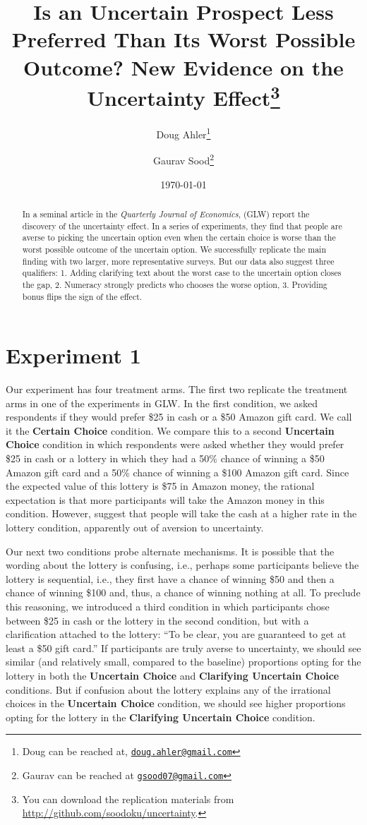 \documentclass[12pt, letterpaper]{article}
\title{Is an Uncertain Prospect Less Preferred Than Its Worst Possible Outcome? New Evidence on the Uncertainty Effect\thanks{You can download the replication materials from \href{http://github.com/soodoku/uncertainty}{http://github.com/soodoku/uncertainty}.}}
\author{Doug Ahler\thanks{Doug can be reached at, \href{mailto:doug.ahler@gmail.com}{\footnotesize{\texttt{doug.ahler@gmail.com}}}} \and Gaurav Sood\thanks{Gaurav can be reached at \href{mailto:gsood07@gmail.com}{\footnotesize{\texttt{gsood07@gmail.com}}}}}
\date{\today}
\begin{document}
\maketitle

\thispagestyle{empty}
\begin{abstract}
\noindent In a seminal article in the \textit{Quarterly Journal of Economics}, \cite{gneezy2006uncertainty} (GLW) report the discovery of the uncertainty effect. In a series of experiments, they find that people are averse to picking the uncertain option even when the certain choice is worse than the worst possible outcome of the uncertain option. We successfully replicate the main finding with two larger, more representative surveys. But our data also suggest three qualifiers: 1. Adding clarifying text about the worst case to the uncertain option closes the gap, 2. Numeracy strongly predicts who chooses the worse option, 3. Providing bonus flips the sign of the effect.
\end{abstract} 
\clearpage
\setcounter{page}{1}
\doublespace

\section*{Experiment 1}

Our experiment has four treatment arms. The first two replicate the treatment arms in one of the experiments in GLW. In the first condition, we asked respondents if they would prefer \$25 in cash or a \$50 Amazon gift card. We call it the \textbf{Certain Choice} condition. We compare this to a second \textbf{Uncertain Choice} condition in which respondents were asked whether they would prefer \$25 in cash or a lottery in which they had a 50\% chance of winning a \$50 Amazon gift card and a 50\% chance of winning a \$100 Amazon gift card. Since the expected value of this lottery is \$75 in Amazon money, the rational expectation is that more participants will take the Amazon money in this condition. However, \cite{gneezy2006uncertainty} suggest that people will take the cash at a higher rate in the lottery condition, apparently out of aversion to uncertainty.

Our next two conditions probe alternate mechanisms. It is possible that the wording about the lottery is confusing, i.e., perhaps some participants believe the lottery is sequential, i.e., they first have a chance of winning \$50 and then a chance of winning \$100 and, thus, a chance of winning nothing at all. To preclude this reasoning, we introduced a third condition in which participants chose between \$25 in cash or the lottery in the second condition, but with a clarification attached to the lottery: ``To be clear, you are guaranteed to get at least a \$50 gift card.'' If participants are truly averse to uncertainty, we should see similar (and relatively small, compared to the baseline) proportions opting for the lottery in both the \textbf{Uncertain Choice} and \textbf{Clarifying Uncertain Choice} conditions. But if confusion about the lottery explains any of the irrational choices in the \textbf{Uncertain Choice} condition, we should see higher proportions opting for the lottery in the \textbf{Clarifying Uncertain Choice} condition.
\end{document}
